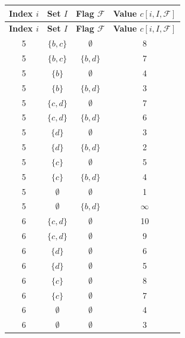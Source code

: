     \hfill
    \begin{minipage}{0.45\textwidth}
    \begin{longtable}{|c|c|c|c|}
    \hline
    \textbf{Index \(i\)} & \textbf{Set \(I\)} & \textbf{Flag \( \mathcal{F} \)} & \textbf{Value \( c[i, I, \mathcal{F}] \)} \\
    \hline
    \endfirsthead
    \hline
    \textbf{Index \(i\)} & \textbf{Set \(I\)} & \textbf{Flag \( \mathcal{F} \)} & \textbf{Value \( c[i, I, \mathcal{F}] \)} \\
    \hline
    \endhead
    \hline
    \endfoot
    
    5 & \( \{ b, c \} \) & \( \emptyset \) & 8 \\
    5 & \( \{ b, c \} \) & \( \{ b, d \} \) & 7 \\
    5 & \( \{ b \} \) & \( \emptyset \) & 4 \\
    5 & \( \{ b \} \) & \( \{ b, d \} \) & 3 \\
    
    5 & \( \{ c, d \} \) & \( \emptyset \) & 7 \\
    5 & \( \{ c, d \} \) & \( \{ b, d \} \) & 6 \\
    5 & \( \{ d \} \) & \( \emptyset \) & 3 \\
    5 & \( \{ d \} \) & \( \{ b, d \} \) & 2 \\
    
    5 & \( \{ c \} \) & \( \emptyset \) & 5 \\
    5 & \( \{ c \} \) & \( \{ b, d \} \) & 4 \\
    5 & \( \emptyset \) & \( \emptyset \) & 1 \\
    5 & \( \emptyset \) & \( \{ b, d \} \) & \( \infty \) \\

    \hline
    6 & \( \{ c, d \} \) & \( \emptyset \) & 10 \\
    6 & \( \{ c, d \} \) & \( \emptyset \) & 9 \\
    6 & \( \{ d \} \) & \( \emptyset \) & 6 \\
    6 & \( \{ d \} \) & \( \emptyset \) & 5 \\

    6 & \( \{ c \} \) & \( \emptyset \) & 8 \\
    6 & \( \{ c \} \) & \( \emptyset \) & 7 \\
    6 & \( \emptyset \) & \( \emptyset \) & 4 \\
    6 & \( \emptyset \) & \( \emptyset \) & 3 \\
    

\end{longtable}
\end{minipage}
